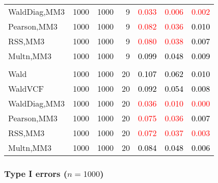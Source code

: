\documentclass[
]{article}
\begin{document}
\begin{table}[H]
{\begin{tabular}[t]{lrrrrrr}
\hspace{1em}WaldDiag,MM3 & 1000 & 1000 & 9 & \textcolor{red}{0.033} & \textcolor{red}{0.006} & \textcolor{red}{0.002}\\
\hspace{1em}Pearson,MM3 & 1000 & 1000 & 9 & \textcolor{red}{0.082} & \textcolor{red}{0.036} & \textcolor{black}{0.010}\\
\hspace{1em}RSS,MM3 & 1000 & 1000 & 9 & \textcolor{red}{0.080} & \textcolor{red}{0.038} & \textcolor{black}{0.007}\\
\hspace{1em}Multn,MM3 & 1000 & 1000 & 9 & \textcolor{black}{0.099} & \textcolor{black}{0.048} & \textcolor{black}{0.009}\\
\addlinespace[0.3em]
\multicolumn{7}{l}{\textbf{3F 15V}}\\
\hspace{1em}Wald & 1000 & 1000 & 20 & \textcolor{black}{0.107} & \textcolor{black}{0.062} & \textcolor{black}{0.010}\\
\hspace{1em}WaldVCF & 1000 & 1000 & 20 & \textcolor{black}{0.092} & \textcolor{black}{0.054} & \textcolor{black}{0.008}\\
\hspace{1em}WaldDiag,MM3 & 1000 & 1000 & 20 & \textcolor{red}{0.036} & \textcolor{red}{0.010} & \textcolor{red}{0.000}\\
\hspace{1em}Pearson,MM3 & 1000 & 1000 & 20 & \textcolor{red}{0.075} & \textcolor{red}{0.036} & \textcolor{black}{0.007}\\
\hspace{1em}RSS,MM3 & 1000 & 1000 & 20 & \textcolor{red}{0.072} & \textcolor{red}{0.037} & \textcolor{red}{0.003}\\
\hspace{1em}Multn,MM3 & 1000 & 1000 & 20 & \textcolor{black}{0.084} & \textcolor{black}{0.048} & \textcolor{black}{0.006}\\
\bottomrule
\end{tabular}}
\endgroup{}
\end{table}

\subsubsection{\texorpdfstring{Type I errors
(\(n=1000\))}{Type I errors (n=1000)}}\label{type-i-errors-n1000-3}
\end{document}
